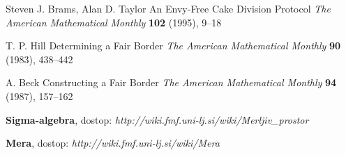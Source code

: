 \documentclass[a4paper, 12pt]{article}
\begin{document}
	\pagebreak
	
	\begin{thebibliography}{5}
		
		Steven J. Brams, Alan D. Taylor
		An Envy-Free Cake Division Protocol
		\textit{The American Mathematical Monthly} \textbf{102} (1995), 9–18
		
		T. P. Hill 
		Determining a Fair Border
		\textit{The American Mathematical Monthly} \textbf{90} (1983), 438–442
		
		A. Beck 
		Constructing a Fair Border
		\textit{The American Mathematical Monthly} \textbf{94} (1987), 157–162
		
		\textbf{Sigma-algebra}, dostop: \textit{http://wiki.fmf.uni-lj.si/wiki/Merljiv\_prostor}		
		
		\textbf{Mera}, dostop: \textit{http://wiki.fmf.uni-lj.si/wiki/Mera}
		
	\end{thebibliography}
	
\end{document}
